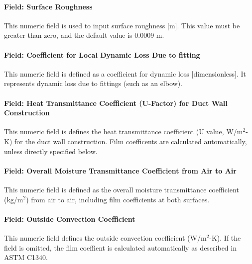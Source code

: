 \paragraph{Field: Surface Roughness}\label{field-surface-roughness}

This numeric field is used to input surface roughness {[}m{]}. This value must be greater than zero, and the default value is 0.0009 m.

\paragraph{Field: Coefficient for Local Dynamic Loss Due to fitting}\label{field-coefficient-for-local-dynamic-loss-due-to-fitting}

This numeric field is defined as a coefficient for dynamic loss {[}dimensionless{]}. It represents dynamic loss due to fittings (such as an elbow).

\paragraph{Field: Heat Transmittance Coefficient (U-Factor) for Duct Wall Construction}\label{field-heat-transmittance-coefficient-u-factor-from-duct-construction}

This numeric field is defines the heat transmittance coefficient (U value, W/m\(^{2}\)-K) for the duct wall construction. Film coefficents are calculated automatically, unless directly specified below.

\paragraph{Field: Overall Moisture Transmittance Coefficient from Air to Air}\label{field-overall-moisture-transmittance-coefficient-from-air-to-air}

This numeric field is defined as the overall moisture transmittance coefficient (kg/m\(^{2}\)) from air to air, including film coefficients at both surfaces.

\paragraph{Field: Outside Convection Coefficient}\label{field-outside-convection-coefficent}

This numeric field defines the outside convection coefficient (W/m\(^{2}\)-K). If the field is omitted, the film coeffient is calculated automatically as described in ASTM C1340.

